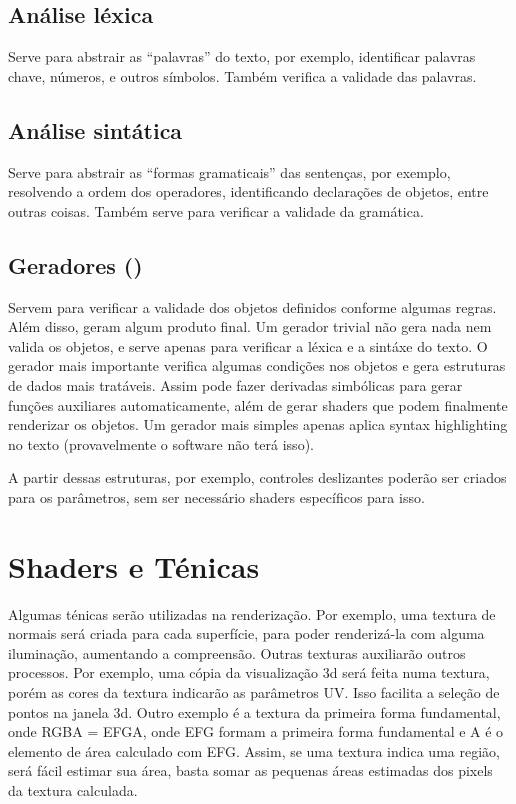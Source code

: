 \documentclass[10pt,a4paper]{article}
\begin{document}
\subsection{Análise léxica}
Serve para abstrair as ``palavras'' do texto, por exemplo, identificar palavras chave, números, e outros símbolos.
Também verifica a validade das palavras.

\subsection{Análise sintática}
Serve para abstrair as ``formas gramaticais'' das sentenças, por exemplo, resolvendo a ordem dos operadores,
identificando declarações de objetos, entre outras coisas. Também serve para verificar a validade da gramática.

\subsection{Geradores ()}
Servem para verificar a validade dos objetos definidos conforme algumas regras. Além disso, geram algum produto final.
Um gerador trivial não gera nada nem valida os objetos, e serve apenas para verificar a léxica e a sintáxe do texto.
O gerador mais importante verifica algumas condições nos objetos e gera estruturas de dados mais tratáveis.
Assim pode fazer derivadas simbólicas para gerar funções auxiliares automaticamente,
além de gerar shaders que podem finalmente renderizar os objetos.
Um gerador mais simples apenas aplica syntax highlighting no texto (provavelmente o software não terá isso).

A partir dessas estruturas, por exemplo, controles deslizantes poderão ser criados para os parâmetros, 
sem ser necessário shaders específicos para isso.

\section{Shaders e Ténicas}
Algumas ténicas serão utilizadas na renderização. Por exemplo, uma textura de normais será criada para cada superfície,
para poder renderizá-la com alguma iluminação, aumentando a compreensão. Outras texturas auxiliarão outros processos.
Por exemplo, uma cópia da visualização 3d será feita numa textura,
porém as cores da textura indicarão as parâmetros UV. Isso facilita a seleção de pontos na janela 3d.
Outro exemplo é a textura da primeira forma fundamental, onde RGBA = EFGA,
onde EFG formam a primeira forma fundamental e A é o elemento de área calculado com EFG.
Assim, se uma textura indica uma região, será fácil estimar sua área,
basta somar as pequenas áreas estimadas dos pixels da textura calculada.
\end{document}
